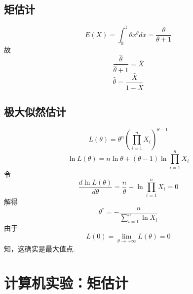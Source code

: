 \documentclass{article}
\begin{document}
\begin{CJK}{UTF8}{gbsn}
\subsection{矩估计}
$$ E(X)=\int_{0}^{1}\theta x^{\theta}dx=\frac{\theta}{\theta+1}$$
故
$$ \frac{\hat{\theta}}{\hat{\theta}+1}=\bar{X}$$
$$ \hat{\theta}=\frac{\bar{X}}{1-\bar{X}}$$
\subsection{极大似然估计}
$$ L(\theta)=\theta^{n}(\prod\limits_{i=1}^{n}X_{i})^{\theta-1}$$
$$ \ln L(\theta)=n\ln\theta+(\theta-1)\ln\prod\limits_{i=1}^{n}X_{i}$$
令
$$ \frac{d\ln L(\theta)}{d\theta}=\frac{n}{\theta}+\ln\prod\limits_{i=1}^{n}X_{i}=0$$
解得
$$ \theta^{*}=-\frac{n}{\sum\limits_{i=1}^{n}\ln X_{i}}$$
由于
$$ L(0)=\lim\limits_{\theta\to+\infty}L(\theta)=0$$
知，这确实是最大值点.
\section{计算机实验：矩估计}

\end{CJK}
\end{document}
